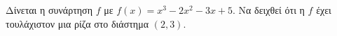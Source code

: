 Δίνεται η συνάρτηση $ f $ με $ f(x)=x^3-2x^2-3x+5 $. Να δειχθεί ότι η $ f $ έχει τουλάχιστον μια ρίζα στο διάστημα $ (2,3) $.
